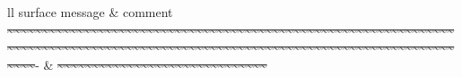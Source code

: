 \documentclass[10pt,twoside,english]{_support/latex/sbabook/sbabook}
\begin{document}
\begin{fullwidthtabular}{ll}
\toprule
surface message & comment \\
\sout{}\sout{\textasciitilde{}\textasciitilde{}}\sout{\textasciitilde{}\textasciitilde{}\textasciitilde{}\textasciitilde{}}\sout{\textasciitilde{}\textasciitilde{}\textasciitilde{}\textasciitilde{}\textasciitilde{}\textasciitilde{}}\sout{\textasciitilde{}\textasciitilde{}\textasciitilde{}\textasciitilde{}\textasciitilde{}\textasciitilde{}\textasciitilde{}\textasciitilde{}}\sout{\textasciitilde{}\textasciitilde{}\textasciitilde{}\textasciitilde{}\textasciitilde{}\textasciitilde{}\textasciitilde{}\textasciitilde{}\textasciitilde{}\textasciitilde{}}\sout{\textasciitilde{}\textasciitilde{}\textasciitilde{}\textasciitilde{}\textasciitilde{}\textasciitilde{}\textasciitilde{}\textasciitilde{}\textasciitilde{}\textasciitilde{}\textasciitilde{}\textasciitilde{}}\sout{\textasciitilde{}\textasciitilde{}\textasciitilde{}\textasciitilde{}\textasciitilde{}\textasciitilde{}\textasciitilde{}\textasciitilde{}\textasciitilde{}\textasciitilde{}\textasciitilde{}\textasciitilde{}\textasciitilde{}\textasciitilde{}}\sout{\textasciitilde{}\textasciitilde{}\textasciitilde{}\textasciitilde{}\textasciitilde{}\textasciitilde{}\textasciitilde{}\textasciitilde{}\textasciitilde{}\textasciitilde{}\textasciitilde{}\textasciitilde{}\textasciitilde{}\textasciitilde{}\textasciitilde{}\textasciitilde{}}\sout{\textasciitilde{}\textasciitilde{}\textasciitilde{}\textasciitilde{}\textasciitilde{}\textasciitilde{}\textasciitilde{}\textasciitilde{}\textasciitilde{}\textasciitilde{}\textasciitilde{}\textasciitilde{}\textasciitilde{}\textasciitilde{}\textasciitilde{}\textasciitilde{}\textasciitilde{}\textasciitilde{}}\sout{\textasciitilde{}\textasciitilde{}\textasciitilde{}\textasciitilde{}\textasciitilde{}\textasciitilde{}\textasciitilde{}\textasciitilde{}\textasciitilde{}\textasciitilde{}\textasciitilde{}\textasciitilde{}\textasciitilde{}\textasciitilde{}\textasciitilde{}\textasciitilde{}\textasciitilde{}\textasciitilde{}\textasciitilde{}\textasciitilde{}}\sout{\textasciitilde{}\textasciitilde{}\textasciitilde{}\textasciitilde{}\textasciitilde{}\textasciitilde{}\textasciitilde{}\textasciitilde{}\textasciitilde{}\textasciitilde{}\textasciitilde{}\textasciitilde{}\textasciitilde{}\textasciitilde{}\textasciitilde{}\textasciitilde{}\textasciitilde{}\textasciitilde{}\textasciitilde{}\textasciitilde{}\textasciitilde{}\textasciitilde{}}- & \sout{}\sout{\textasciitilde{}\textasciitilde{}}\sout{\textasciitilde{}\textasciitilde{}\textasciitilde{}\textasciitilde{}}\sout{\textasciitilde{}\textasciitilde{}\textasciitilde{}\textasciitilde{}\textasciitilde{}\textasciitilde{}}\sout{\textasciitilde{}\textasciitilde{}\textasciitilde{}\textasciitilde{}\textasciitilde{}\textasciitilde{}\textasciitilde{}\textasciitilde{}}\sout{\textasciitilde{}\textasciitilde{}\textasciitilde{}\textasciitilde{}\textasciitilde{}\textasciitilde{}\textasciitilde{}\textasciitilde{}\textasciitilde{}\textasciitilde{}} \\

\end{fullwidthtabular}
\end{document}
